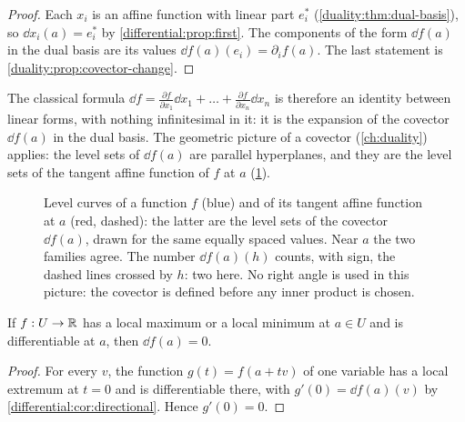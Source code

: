 \begin{notechapter}
\begin{proof}
Each $x_i$ is an affine function with linear part $e_i^*$
(\cref{duality:thm:dual-basis}), so $\dd x_i(a) = e_i^*$ by
\cref{differential:prop:first}. The components of the form $\dd f(a)$ in
the dual basis are its values $\dd f(a)(e_i) = \partial_if(a)$. The last
statement is \cref{duality:prop:covector-change}.
\end{proof}

The classical formula
$\dd f = \frac{\partial f}{\partial x_1}\dd x_1 + \dots
+ \frac{\partial f}{\partial x_n}\dd x_n$
is therefore an identity between linear forms, with nothing infinitesimal
in it: it is the expansion of the covector $\dd f(a)$ in the dual basis.
The geometric picture of a covector (\cref{ch:duality}) applies: the level
sets of $\dd f(a)$ are parallel hyperplanes, and they are the level sets
of the tangent affine function of $f$ at $a$
(\cref{differential:fig:covector}).

\begin{figure}[ht]
\centering
{}
\caption{Level curves of a function $f$ (blue) and of its tangent affine
function at $a$ (red, dashed): the latter are the level sets of the
covector $\dd f(a)$, drawn for the same equally spaced values. Near $a$
the two families agree. The number $\dd f(a)(h)$ counts, with sign, the
dashed lines crossed by $h$: two here. No right angle is used in this
picture: the covector is defined before any inner product is chosen.}
\label{differential:fig:covector}
\end{figure}

\begin{theorem}\label{differential:thm:fermat}
If $f:U\to\mathbb{R}$ has a local maximum or a local minimum at $a\in U$ and is
differentiable at $a$, then $\dd f(a) = 0$.
\end{theorem}

\begin{proof}
For every $v$, the function $g(t) = f(a + tv)$ of one variable has a local
extremum at $t = 0$ and is differentiable there, with
$g'(0) = \dd f(a)(v)$ by \cref{differential:cor:directional}. Hence
$g'(0) = 0$.
\end{proof}


\end{notechapter}
